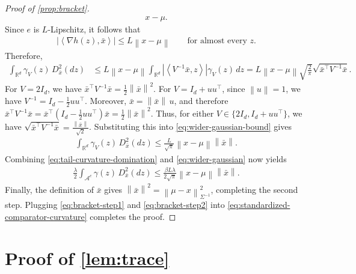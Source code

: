 \documentclass[11pt]{article}
\newcommand{\R}{\mathbb R}
\newcommand{\1}{\mathbf 1}
\newcommand{\ip}[2]{\left\langle #1,#2\right\rangle}
\newcommand{\norm}[1]{\left\lVert #1\right\rVert}
\newcommand{\normm}[2]{\left\lVert #1\right\rVert_{#2}}
\begin{document}
\begin{proof}[Proof of \cref{prop:bracket}]
\begin{align}
        {x-\mu}.
    \end{align}
    Since $e$ is $L$-Lipschitz, it follows that
    \begin{align}
        \left|\ip{\nabla h(z)}{\bar{x}}\right|
        \leq
        L\norm{x-\mu}
        \qquad\text{for almost every }z.
    \end{align}
    Therefore,
    \begin{align}
        \int_{\R^d}\gamma_V(z)\,D^2_{\bar{x}}(dz)
         & \leq
        L\norm{x-\mu}
        \int_{\R^d}
        \left|\ip{V^{-1}\bar{x}}{z}\right|
        \gamma_V(z)\,dz
        =
        L\norm{x-\mu}
        \sqrt{\frac{2}{\pi}}
        \sqrt{\bar{x}^\top V^{-1}\bar{x}}.
        \label{eq:wider-gaussian-bound}
    \end{align}
    For $V=2I_d$, we have
    $\bar{x}^\top V^{-1}\bar{x}=\frac12\norm{\bar{x}}^2$.
    For $V=I_d+uu^\top$, since $\norm u=1$,
    we have
    $V^{-1}
        =
        I_d-\frac12uu^\top$.
    Moreover, $\bar{x}=\norm{\bar{x}}\,u$, and therefore
    $\bar{x}^\top V^{-1}\bar{x}=
        \bar{x}^\top
        \left(I_d-\frac12uu^\top\right)\bar{x}
        =\frac12\norm{\bar{x}}^2$.
    Thus, for either
    $V\in\{2I_d,I_d+uu^\top\}$,
    we have
    $\sqrt{\bar{x}^\top V^{-1}\bar{x}} = \frac{\norm{\bar{x}}}{\sqrt2}$.
    Substituting this into \eqref{eq:wider-gaussian-bound} gives
    \begin{align}
        \int_{\R^d}\gamma_V(z)\,D^2_{\bar{x}}(dz)
        \leq
        \frac{L}{\sqrt\pi}
        \norm{x-\mu}\norm{\bar{x}}.
        \label{eq:wider-gaussian}
    \end{align}
    Combining \eqref{eq:tail-curvature-domination} and
    \eqref{eq:wider-gaussian} now yields
    \begin{align}
        \frac{\lambda}{2}\int_{\mathcal A^c}\gamma(z)\,D^2_{\bar{x}}(dz)
        \leq
        \frac{\beta L \lambda}{2\sqrt\pi}
        \norm{x-\mu}\norm{\bar{x}}.
        \label{eq:bracket-step2}
    \end{align}
    Finally, the definition of $\bar{x}$ gives
    $\norm{\bar{x}}^2=\normm{\mu-x}{\Sigma^{-1}}^2$,
    completing the second step.
    Plugging \eqref{eq:bracket-step1} and \eqref{eq:bracket-step2}
    into \eqref{eq:standardized-comparator-curvature}
    completes the proof.
\end{proof}

\section{Proof of \cref{lem:trace}}
\label{app:trace}
\end{document}

